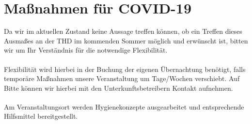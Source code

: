 \documentclass[11pt]{article}
\begin{document}
\clearpage
\section{Maßnahmen für COVID-19}
Da wir im aktuellen Zustand keine Aussage treffen können, ob ein Treffen dieses Ausmaßes an der THD im kommenden Sommer möglich und erwünscht ist, bitten wir um Ihr Verständnis für die notwendige Flexibilität.\\
\\
Flexibilität wird hierbei in der Buchung der eigenen Übernachtung benötigt, falls temporäre Maßnahmen unsere Veranstaltung um Tage/Wochen verschiebt. Auf Bitte können wir hierbei mit den Unterkunftsbetreibern Kontakt aufnehmen.\\
\\
Am Veranstaltungsort werden Hygienekonzepte ausgearbeitet und entsprechende Hilfsmittel bereitgestellt.\\

\end{document}
